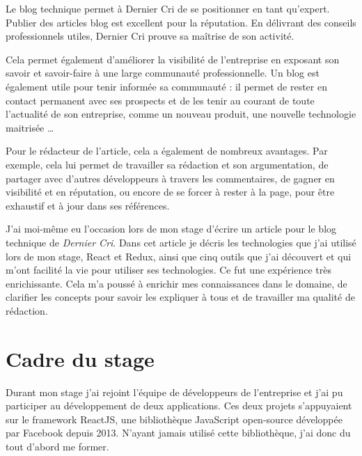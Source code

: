 \bigskip

Le blog technique permet à Dernier Cri de se positionner en tant
qu'expert. Publier des articles blog est excellent pour la réputation.
En délivrant des conseils professionnels utiles, Dernier Cri prouve sa
maîtrise de son activité.

\bigskip

Cela permet également d'améliorer la visibilité de l'entreprise en
exposant son savoir et savoir-faire à une large communauté
professionnelle. Un blog est également utile pour tenir informée sa
communauté : il permet de rester en contact permanent avec ses prospects
et de les tenir au courant de toute l'actualité de son entreprise, comme
un nouveau produit, une nouvelle technologie maitrisée \ldots{}

\bigskip

Pour le rédacteur de l'article, cela a également de nombreux avantages.
Par exemple, cela lui permet de travailler sa rédaction et son
argumentation, de partager avec d'autres développeurs à travers les
commentaires, de gagner en visibilité et en réputation, ou encore de se
forcer à rester à la page, pour être exhaustif et à jour dans ses
références.

\bigskip

J'ai moi-même eu l'occasion lors de mon stage d'écrire un article pour
le blog technique de \emph{Dernier Cri}. Dans cet article je décris les
technologies que j'ai utilisé lors de mon stage, React et Redux, ainsi
que cinq outils que j'ai découvert et qui m'ont facilité la vie pour
utiliser ses technologies. Ce fut une expérience très enrichissante.
Cela m'a poussé à enrichir mes connaissances dans le domaine, de
clarifier les concepts pour savoir les expliquer à tous et de travailler
ma qualité de rédaction.

\newpage

\section{Cadre du stage}\label{cadre-du-stage}

\bigskip

Durant mon stage j'ai rejoint l'équipe de développeurs de l'entreprise
et j'ai pu participer au développement de deux applications. Ces deux
projets s'appuyaient sur le framework ReactJS, une bibliothèque
JavaScript open-source développée par Facebook depuis 2013. N'ayant
jamais utilisé cette bibliothèque, j'ai donc du tout d'abord me former.

